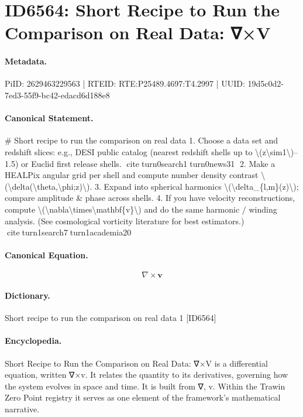 \section*{ID6564: Short Recipe to Run the Comparison on Real Data: ∇×V}
\paragraph{Metadata.}
PiID: 2629463229563 | RTEID: RTE:P25489.4697:T4.2997 | UUID: 19d5c0d2-7ed3-55f9-bc42-edacd6d188e8

\paragraph{Canonical Statement.}
\# Short recipe to run the comparison on real data 1. Choose a data set and redshift slices: e.g., DESI public catalog (nearest redshift shells up to \textbackslash{}(z\textbackslash{}sim1\textbackslash{})–1.5) or Euclid first release shells. citeturn0search1turn0news31 2. Make a HEALPix angular grid per shell and compute number density contrast \textbackslash{}(\textbackslash{}delta(\textbackslash{}theta,\textbackslash{}phi;z)\textbackslash{}). 3. Expand into spherical harmonics \textbackslash{}(\textbackslash{}delta\_\{l,m\}(z)\textbackslash{}); compare amplitude \& phase across shells. 4. If you have velocity reconstructions, compute \textbackslash{}(\textbackslash{}nabla\textbackslash{}times\textbackslash{}mathbf\{v\}\textbackslash{}) and do the same harmonic / winding analysis. (See cosmological vorticity literature for best estimators.) citeturn1search7turn1academia20

\paragraph{Canonical Equation.}
\[
\nabla\times\mathbf{v}
\]

\paragraph{Dictionary.}
Short recipe to run the comparison on real data 1 [ID6564]

\paragraph{Encyclopedia.}
Short Recipe to Run the Comparison on Real Data: ∇×V is a differential equation, written ∇×v. It relates the quantity to its derivatives, governing how the system evolves in space and time. It is built from ∇, v. Within the Trawin Zero Point registry it serves as one element of the framework's mathematical narrative.
